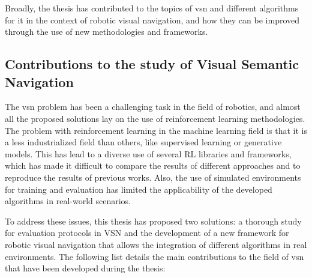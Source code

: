 Broadly, the thesis has contributed to the topics of \acrlong{vsn} and different algorithms for it in the context of robotic visual navigation, and how they can be improved through the use of new methodologies and frameworks.

\subsection{Contributions to the study of Visual Semantic Navigation}\label{subsec:contributions-to-visual-semantic-navigation}

The \acrshort{vsn} problem has been a challenging task in the field of robotics, and almost all the proposed solutions lay on the use of reinforcement learning methodologies.
The problem with reinforcement learning in the machine learning field is that it is a less industrialized field than others, like supervised learning or generative models.
This has lead to a diverse use of several \acrshort{RL} libraries and frameworks, which has made it difficult to compare the results of different approaches and to reproduce the results of previous works.
Also, the use of simulated environments for training and evaluation has limited the applicability of the developed algorithms in real-world scenarios.

To address these issues, this thesis has proposed two solutions: a thorough study for evaluation protocols in \acrshort{VSN} and the development of a new framework for robotic visual navigation that allows the integration of different algorithms in real environments.
The following list details the main contributions to the field of \acrshort{vsn} that have been developed during the thesis:

